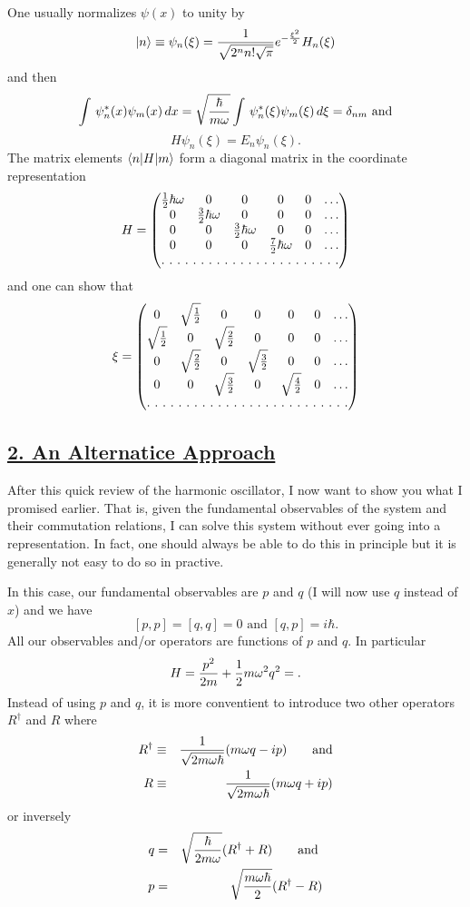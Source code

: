One usually normalizes $\psi(x)$ to unity by
$$|n\rangle \equiv \psi_n(\xi) = {1\over\sqrt{2^n n!\sqrt{\pi}}}e^{-{\xi^2\over 2}} H_n(\xi)$$ and then 
$$\int\, \psi^*_n(x) \psi_m(x)\, dx = \sqrt{{\hbar\over m\omega}} \int\, \psi^*_n(\xi) \psi_m(\xi)\, d\xi = \delta_{nm}\mbox{  and}$$
$$H\psi_n(\xi) = E_n\psi_n(\xi).$$
The matrix elements $\langle n| H| m \rangle$ form a diagonal matrix in the coordinate representation
\[ H = \begin{pmatrix}
\half\hbar\omega & 0  & 0 & 0& 0& \hdots  \\
0  & {3\over2} \hbar\omega & 0&  0& 0& \hdots  \\
0 & 0   & {3\over2}\hbar\omega& 0& 0& \hdots \\
0 & 0   & 0 & {7\over2}\hbar\omega & 0& \hdots \\
\hdotsfor[2]{6}\\
\end{pmatrix} \]
and one can show that 
\[ \xi  = \begin{pmatrix}
0 & \sqrt{1\over2} & 0  & 0 & 0& 0& \hdots  \\
\sqrt{1\over2} & 0  & \sqrt{2\over2} & 0&  0& 0& \hdots  \\
0& \sqrt{2\over2}  & 0   & \sqrt{3\over2}& 0& 0& \hdots \\
0& 0 & \sqrt{3\over2}   & 0 & \sqrt{4\over2} & 0& \hdots \\
\hdotsfor[2]{7}\\
\end{pmatrix} \]

\subsection{\underline{2. An Alternatice Approach}}
After this quick review of the harmonic oscillator, I now want to show you what I promised earlier. That is, given the fundamental observables of the system and their commutation relations, I can 
solve this system without ever going into a representation. In fact, one should always be able to do this in principle but it is generally not easy to do so in practive. 

In this case, our fundamental observables are $p$ and $q$ (I will now use $q$ instead of $x$) and we have
$$\left[ p,p\right] = \left[q,q\right] = 0\mbox{   and  } \left[q,p\right] = i\hbar.$$
All our observables and/or operators are functions of $p$ and $q$. In particular
$$H = {p^2\over2m} + {1\over2} m\omega^2 q^2 = .$$
Instead of using $p$ and $q$, it is more conventient to introduce two other operators $R^\dagger$ and $R$ where 
\begin{eqnarray*}
R^\dagger &\equiv& {1\over\sqrt{2m\omega\hbar}}(m\omega q - ip)\mbox{~~~~~        and} \\
R               &\equiv& {1\over\sqrt{2m\omega\hbar}}(m\omega q + ip)
\end{eqnarray*}
or inversely
\begin{eqnarray*}
q &=& \sqrt{\hbar\over2m\omega} (R^\dagger + R)\mbox{~~~~~         and } \\
p &=& \sqrt{m\omega\hbar\over2} (R^\dagger  - R)
\end{eqnarray*}

